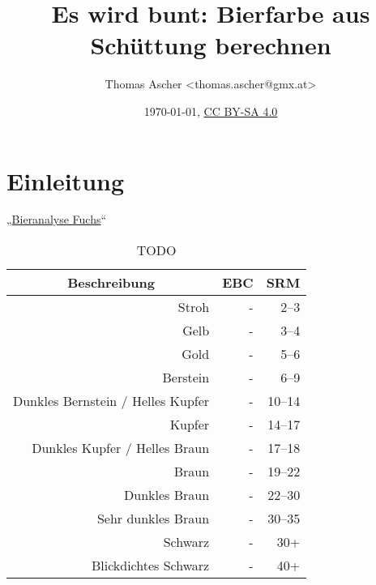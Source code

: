 \documentclass[a4paper,parskip=half]{scrartcl}
\title{Es wird bunt: Bierfarbe aus Schüttung berechnen}
\author{Thomas Ascher <thomas.ascher@gmx.at>}
\date{\today, \href{http://creativecommons.org/licenses/by-sa/4.0/}{CC BY-SA 4.0}}
\begin{document}
\maketitle

\section*{Einleitung}

„\href{https://bieranalyse.de}{Bieranalyse Fuchs}“


\begin{table}[H]
\centering
\begin{tabular}{rrr}
\toprule
\multicolumn{1}{c}{\textbf{Beschreibung}} & \multicolumn{1}{c}{\textbf{EBC}} & \multicolumn{1}{c}{\textbf{SRM}} \\
\midrule
Stroh & - & 2–3 \\
Gelb & - & 3–4 \\
Gold & - & 5–6 \\
Berstein & - & 6–9 \\
Dunkles Bernstein / Helles Kupfer & - & 10–14 \\
Kupfer & - & 14–17 \\
Dunkles Kupfer / Helles Braun & - & 17–18 \\
Braun & - & 19–22 \\
Dunkles Braun & - & 22–30 \\
Sehr dunkles Braun & - & 30–35 \\
Schwarz & - & 30+ \\
Blickdichtes Schwarz & - & 40+ \\
\bottomrule
\end{tabular}
\caption{TODO \parencite{BJCP2015}}
\label{table:bjcpcolor}
\end{table}

\parencite{BA2021}
\end{document}
